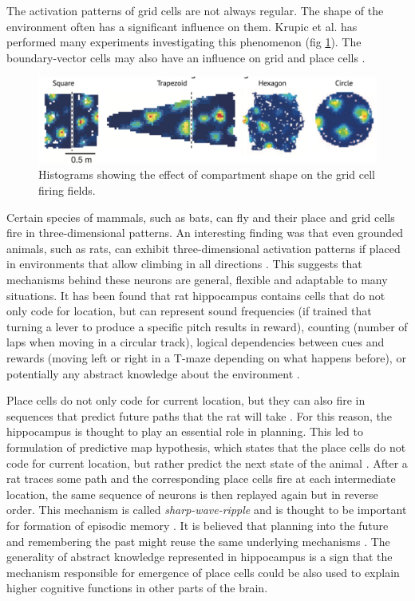 \documentclass[oneside,english,logo]{amuthesis}
\begin{document}
The activation patterns of grid cells are not always regular. The shape of the environment often has a significant influence on them. Krupic et al. \cite{Kurpic} has performed many experiments investigating this phenomenon (fig \ref{fig:kurpic}). The boundary-vector cells may also have an influence on grid and place cells \cite{boundary_vector_cells}.
\begin{figure}[!htbp]
	\centering
	\includegraphics[width=12cm]{kurpic}
	\caption{Histograms showing the effect of compartment shape on the grid cell firing fields.}
	\label{fig:kurpic}
\end{figure}
Certain species of mammals, such as bats, can fly and their place and grid cells fire in three-dimensional patterns. An interesting finding was that even grounded animals, such as rats,
can exhibit three-dimensional activation patterns if placed in environments that allow climbing in all directions \cite{grid_cells_3d}. This suggests that mechanisms behind these neurons are general, flexible and adaptable to many situations.
It has been found that rat hippocampus contains cells that do not only code for location, but can represent sound frequencies (if trained that turning a lever to produce a specific pitch results in reward), counting (number of laps when moving in a circular track), logical dependencies between cues and rewards (moving left or right in a T-maze depending on what happens before), or potentially any abstract knowledge about the environment \cite{hippocampus_abstract_geometry}. 

Place cells do not only code for current location, but they can also fire in sequences that predict future paths that the rat will take \cite{place_cell_sequences}. For this reason, the hippocampus is thought to play an essential role in planning. This led to formulation of predictive map hypothesis, which states that the place cells do not code for current location, but rather predict the next state of the animal \cite{predictive_map}. After a rat traces some path and the corresponding place cells fire at each intermediate location, the same sequence of  neurons is then replayed again but in reverse order. This mechanism is called \textit{sharp-wave-ripple} and is thought to be important for formation of episodic memory \cite{shard_wave_ripple,alternating_sequences}. It is believed that planning into the future and remembering the past might reuse the same underlying mechanisms \cite{past_and_future}.  The generality of abstract knowledge represented in hippocampus is a sign that the mechanism responsible for emergence of place cells could be also used to explain higher cognitive functions in other parts of the brain.
\end{document}
